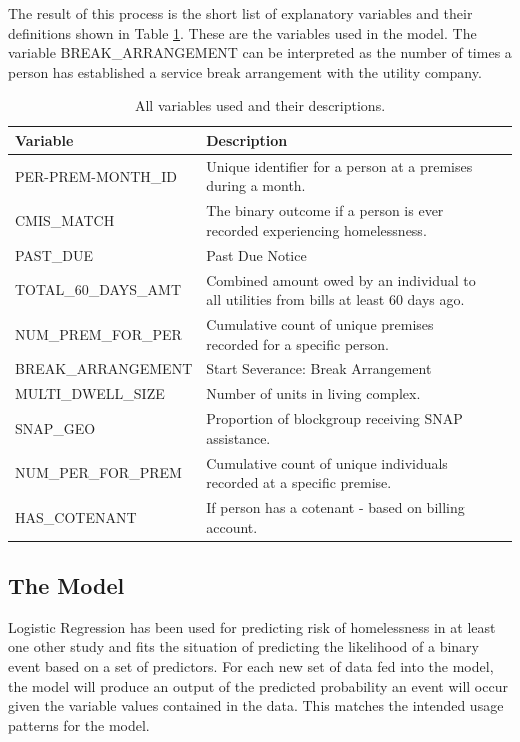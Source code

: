 \documentclass[10pt,letterpaper]{article}
\begin{document}
The result of this process is the short list of explanatory variables and their definitions shown in Table \ref{tbl:varsUsed}. These are the variables used in the model. The variable BREAK\_ARRANGEMENT can be interpreted as the number of times a person has established a service break arrangement with the utility company.

\begin{table}[htb]
    \centering
    \begin{tabular}{l p{10cm} l p{16cm}}
        \toprule
        Variable &                  Description \\
        \midrule
        PER-PREM-MONTH\_ID & Unique identifier for a person at a premises during a month. \\
        CMIS\_MATCH & The binary outcome if a person is ever recorded experiencing homelessness. \\
        PAST\_DUE & Past Due Notice \\
        TOTAL\_60\_DAYS\_AMT & Combined amount owed by an individual to all utilities from bills at least 60 days ago. \\
        NUM\_PREM\_FOR\_PER & Cumulative count of unique premises recorded for a specific person. \\
        BREAK\_ARRANGEMENT & Start Severance: Break Arrangement \\
        MULTI\_DWELL\_SIZE & Number of units in living complex. \\
        SNAP\_GEO & Proportion of blockgroup receiving SNAP assistance. \\
        NUM\_PER\_FOR\_PREM & Cumulative count of unique individuals recorded at a specific premise. \\
        HAS\_COTENANT & If person has a cotenant - based on billing account. \\
        \midrule
    \end{tabular}
    \caption[Variables Used]{All variables used and their descriptions.}
    \label{tbl:varsUsed}
\end{table}

\subsection*{The Model}
Logistic Regression has been used for predicting risk of homelessness in at least one other study \cite{van2009longitudinal} and fits the situation of predicting the likelihood of a binary event based on a set of predictors. For each new set of data fed into the model, the model will produce an output of the predicted probability an event will occur given the variable values contained in the data. This matches the intended usage patterns for the model. 
\end{document}
